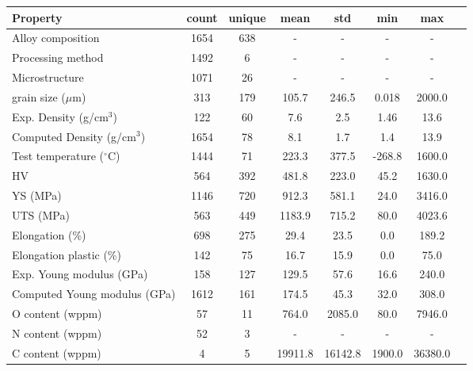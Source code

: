 \begin{tabular}{lccccccc}
\toprule
Property & count & unique & mean & std & min & max \\
\midrule
Alloy composition & 1654 & 638 & - & - & - & - \\
Processing method & 1492 & 6 & - & - & - & - \\
Microstructure & 1071 & 26 & - & - & - & - \\
grain size ($\mu$m) & 313 & 179 & 105.7 & 246.5 & 0.018 & 2000.0 \\
Exp. Density (g/cm$^3$) & 122 & 60 & 7.6 & 2.5 & 1.46 & 13.6 \\
Computed Density (g/cm$^3$) & 1654 & 78 & 8.1 & 1.7 & 1.4 & 13.9 \\
Test temperature ($^\circ$C) & 1444 & 71 & 223.3 & 377.5 & -268.8 & 1600.0 \\
HV & 564 & 392 & 481.8 & 223.0 & 45.2 & 1630.0 \\
YS (MPa) & 1146 & 720 & 912.3 & 581.1 & 24.0 & 3416.0 \\
UTS (MPa) & 563 & 449 & 1183.9 & 715.2 & 80.0 & 4023.6 \\
Elongation (\%) & 698 & 275 & 29.4 & 23.5 & 0.0 & 189.2 \\
Elongation plastic (\%) & 142 & 75 & 16.7 & 15.9 & 0.0 & 75.0 \\
Exp. Young modulus (GPa) & 158 & 127 & 129.5 & 57.6 & 16.6 & 240.0 \\
Computed Young modulus (GPa) & 1612 & 161 & 174.5 & 45.3 & 32.0 & 308.0 \\
O content (wppm) & 57 & 11 & 764.0 & 2085.0 & 80.0 & 7946.0 \\
N content (wppm) & 52 & 3 & - & - & - & - \\
C content (wppm) & 4 & 5 & 19911.8 & 16142.8 & 1900.0 & 36380.0 \\
\bottomrule
\end{tabular}
